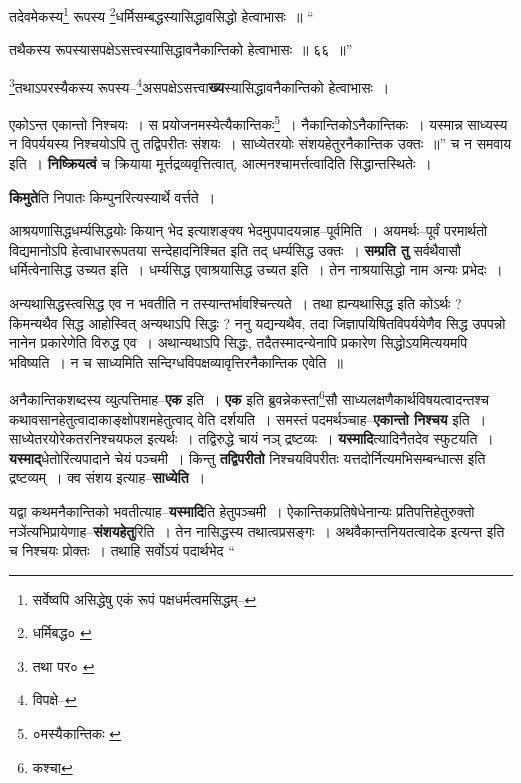 \documentclass[article,12pt,a4paper]{memoir}
\begin{document}
	तदेवमेकस्य\footnote{सर्वेष्वपि असिद्धेषु एकं रूपं पक्षधर्मत्वमसिद्धम्--\cite{dp-msD-n}} रूपस्य \footnote{धर्मिबद्ध० \cite{dp-msA} \cite{dp-edP} \cite{dp-msB} \cite{dp-edH}}\-धर्मिसम्बद्धस्यासिद्धावसिद्धो हेत्वाभासः ॥ “
	  
	तथैकस्य रूपस्यासपक्षेऽसत्त्वस्यासिद्धावनैकान्तिको हेत्वाभासः ॥ ६६ ॥” 
	  
	\footnote{तथा पर० \cite{dp-msA} \cite{dp-msB} \cite{dp-edP} \cite{dp-edH}}\-तथाऽपरस्यैकस्य रूपस्य--\footnote{विपक्षे--\cite{dp-msD-n}}\-असपक्षेऽसत्त्वा\textbf{ख्य}स्यासिद्धावनैकान्तिको हेत्वाभासः । 
	  
	एकोऽन्त एकान्तो निश्चयः । स प्रयोजनमस्येत्यैकान्तिकः\footnote{०मस्यैकान्तिकः \cite{dp-msC} \cite{dp-msD}} । नैकान्तिकोऽनैकान्तिकः । यस्मान्न साध्यस्य न विपर्ययस्य निश्चयोऽपि तु तद्विपरीतः संशयः । साध्येतरयोः संशयहेतुरनैकान्तिक उक्तः ॥” च न समवाय इति । \textbf{निष्क्रियत्वं} च क्रियाया मूर्त्तद्रव्यवृत्तित्वात्, आत्मनश्चामर्त्तत्वादिति सिद्धान्तस्थितेः ।
	\pend
      

	  \pstart \textbf{किमुते}ति निपातः किम्पुनरित्यस्यार्थे वर्त्तते ।
	\pend
      

	  \pstart आश्रयणासिद्धधर्म्यसिद्धयोः कियान् भेद इत्याशङ्क्य भेदमुपपादयन्नाह--पूर्वमिति । अयमर्थः--पूर्वं परमार्थतो विद्यमानोऽपि हेत्वाधाररूपतया सन्देहादनिश्चित इति तद् धर्म्यसिद्ध उक्तः । \textbf{सम्प्रति तु} सर्वथैवासौ धर्मित्वेनासिद्ध उच्यत इति । धर्म्यसिद्ध एवाश्रयासिद्ध उच्यत इति । तेन नाश्रयासिद्धो नाम अन्यः प्रभेदः ।
	\pend
      

	  \pstart अन्यथासिद्धस्त्वसिद्ध एव न भवतीति न तस्यान्तर्भावश्चिन्त्यते । तथा ह्यन्यथासिद्ध इति कोऽर्थः ? किमन्यथैव सिद्ध आहोस्वित् अन्यथाऽपि सिद्धः ? ननु यद्यन्यथैव, तदा जिज्ञापयिषितविपर्ययेणैव सिद्ध उपपन्नो नानेन प्रकारेणेति विरुद्ध एव । अथान्यथाऽपि सिद्धः, तदैतस्मादन्येनापि प्रकारेण सिद्धोऽयमित्ययमपि भविष्यति । न च साध्यमिति सन्दिग्धविपक्षव्यावृत्तिरनैकान्तिक एवेति ॥
	\pend
      

	  \pstart अनैकान्तिकशब्दस्य व्युत्पत्तिमाह--\textbf{एक} इति । \textbf{एक} इति ब्रुवन्नेकस्ता\footnote{कश्चा}\-सौ साध्यलक्षणैकार्थविषयत्वादन्तश्च कथावसानहेतुत्वादाकाङ्क्षोपशमहेतुत्वाद् वेति दर्शयति । समस्तं पदमर्थञ्चाह--\textbf{एकान्तो निश्चय} इति । साध्येतरयोरेकतरनिश्चयफल इत्यर्थः । तद्विरुद्धे चायं नञ् द्रष्टव्यः । \textbf{यस्मादि}त्यादिनैतदेव स्फुटयति । \textbf{यस्माद्}धेतोरित्यपादाने चेयं पञ्चमी । किन्तु \textbf{तद्विपरीतो} निश्चयविपरीतः यत्तदोर्नित्यमभिसम्बन्धात्स इति द्रष्टव्यम् । क्व संशय इत्याह--\textbf{साध्येति} ।
	\pend
      

	  \pstart यद्वा कथमनैकान्तिको भवतीत्याह--\textbf{यस्मादि}ति हेतुपञ्चमी । ऐकान्तिकप्रतिषेधेनान्यः प्रतिपत्तिहेतुरुक्तो नञेंत्यभिप्रायेणाह--\textbf{संशयहेतु}रिति । तेन नासिद्धस्य तथात्वप्रसङ्गः । अथवैकान्तनियतत्वादेक इत्यन्त इति च निश्चयः प्रोक्तः । तथाहि सर्वोऽयं पदार्थभेद  \leavevmode{} “
	  
\end{document}
